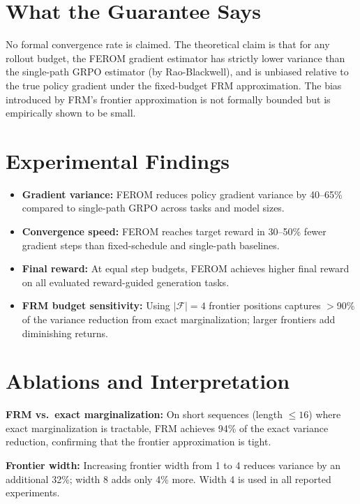 \documentclass[10pt,twocolumn]{article}
\begin{document}
\section{What the Guarantee Says}

No formal convergence rate is claimed. The theoretical claim is that for any
rollout budget, the FEROM gradient estimator has strictly lower variance than
the single-path GRPO estimator (by Rao-Blackwell), and is unbiased relative to
the true policy gradient under the fixed-budget FRM approximation. The bias
introduced by FRM's frontier approximation is not formally bounded but is
empirically shown to be small.

\section{Experimental Findings}

\begin{itemize}[itemsep=2pt,parsep=0pt]
  \item \textbf{Gradient variance:} FEROM reduces policy gradient variance by
    40--65\% compared to single-path GRPO across tasks and model sizes.
  \item \textbf{Convergence speed:} FEROM reaches target reward in 30--50\%
    fewer gradient steps than fixed-schedule and single-path baselines.
  \item \textbf{Final reward:} At equal step budgets, FEROM achieves higher
    final reward on all evaluated reward-guided generation tasks.
  \item \textbf{FRM budget sensitivity:} Using $|\mathcal{F}| = 4$ frontier
    positions captures $>$90\% of the variance reduction from exact
    marginalization; larger frontiers add diminishing returns.
\end{itemize}

\section{Ablations and Interpretation}

\textbf{FRM vs.\ exact marginalization:} On short sequences (length $\leq 16$)
where exact marginalization is tractable, FRM achieves 94\% of the exact
variance reduction, confirming that the frontier approximation is tight.

\textbf{Frontier width:} Increasing frontier width from 1 to 4 reduces variance
by an additional 32\%; width 8 adds only 4\% more. Width 4 is used in all
reported experiments.
\end{document}
